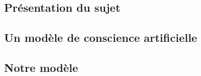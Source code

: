 \subsection{Présentation du sujet}


\subsection{Un modèle de conscience artificielle}


\subsection{Notre modèle}


%


